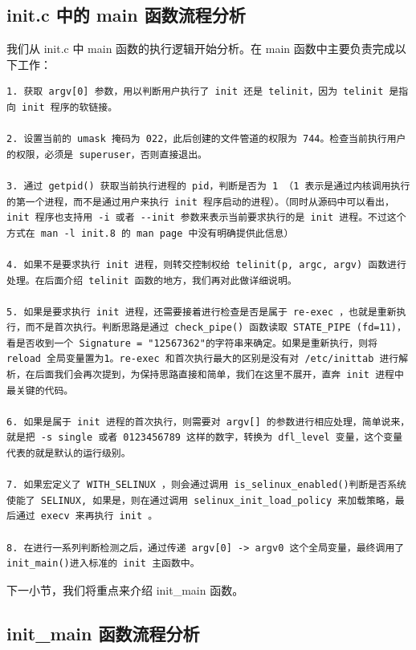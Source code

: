 \subsection{init.c 中的 main 函数流程分析}

我们从 init.c 中 main 函数的执行逻辑开始分析。在 main
函数中主要负责完成以下工作：

{\begin{shaded}\begin{verbatim}
1. 获取 argv[0] 参数，用以判断用户执行了 init 还是 telinit，因为 telinit 是指向 init 程序的软链接。

2. 设置当前的 umask 掩码为 022，此后创建的文件管道的权限为 744。检查当前执行用户的权限，必须是 superuser，否则直接退出。

3. 通过 getpid() 获取当前执行进程的 pid，判断是否为 1 （1 表示是通过内核调用执行的第一个进程，而不是通过用户来执行 init 程序启动的进程）。（同时从源码中可以看出，init 程序也支持用 -i 或者 --init 参数来表示当前要求执行的是 init 进程。不过这个方式在 man -l init.8 的 man page 中没有明确提供此信息）

4. 如果不是要求执行 init 进程，则转交控制权给 telinit(p, argc, argv) 函数进行处理。在后面介绍 telinit 函数的地方，我们再对此做详细说明。

5. 如果是要求执行 init 进程，还需要接着进行检查是否是属于 re-exec ，也就是重新执行，而不是首次执行。判断思路是通过 check_pipe() 函数读取 STATE_PIPE (fd=11)，看是否收到一个 Signature = "12567362"的字符串来确定。如果是重新执行，则将 reload 全局变量置为1。re-exec 和首次执行最大的区别是没有对 /etc/inittab 进行解析，在后面我们会再次提到，为保持思路直接和简单，我们在这里不展开，直奔 init 进程中最关键的代码。

6. 如果是属于 init 进程的首次执行，则需要对 argv[] 的参数进行相应处理，简单说来，就是把 -s single 或者 0123456789 这样的数字，转换为 dfl_level 变量，这个变量代表的就是默认的运行级别。

7. 如果宏定义了 WITH_SELINUX ，则会通过调用 is_selinux_enabled()判断是否系统使能了 SELINUX, 如果是，则在通过调用 selinux_init_load_policy 来加载策略，最后通过 execv 来再执行 init 。

8. 在进行一系列判断检测之后，通过传递 argv[0] -> argv0 这个全局变量，最终调用了 init_main()进入标准的 init 主函数中。
\end{verbatim}\end{shaded}}
下一小节，我们将重点来介绍 init\_main 函数。

\subsection{init\_main 函数流程分析}

